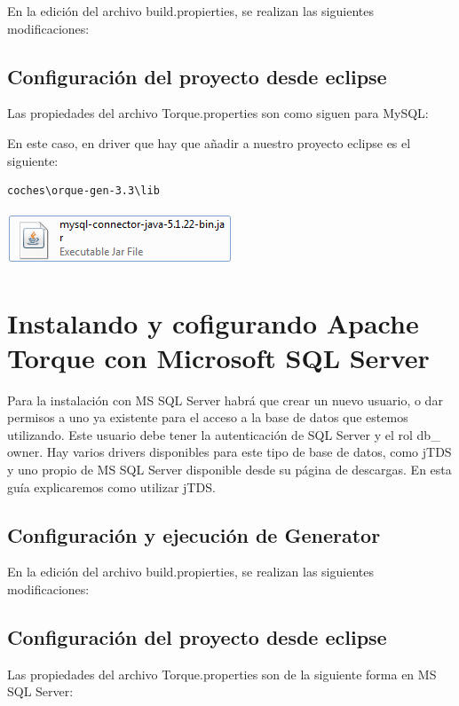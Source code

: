 \documentclass[12pt, oneside]{article}
\begin{document}
En la edición del archivo build.propierties, se realizan las siguientes modificaciones:


\subsection{Configuración del proyecto desde eclipse}
Las propiedades del archivo Torque.properties son como siguen para MySQL:



En este caso, en driver que hay que añadir a nuestro proyecto eclipse es el siguiente:
\begin{lstlisting}
coches\orque-gen-3.3\lib
\end{lstlisting}

\begin{center}
	\includegraphics{img/mysql-file.png}
\end{center}

\section{Instalando y cofigurando Apache Torque con Microsoft SQL Server}
Para la instalación con MS SQL Server habrá que crear un nuevo usuario, o dar permisos a uno ya existente para el acceso a la base de datos que estemos utilizando. Este usuario debe tener la autenticación de SQL Server y el rol db\_ owner. Hay varios drivers disponibles para este tipo de base de datos, como jTDS y uno propio de MS SQL Server disponible desde su página de descargas. En esta guía explicaremos como utilizar jTDS.

\subsection{Configuración y ejecución de Generator}
En la edición del archivo build.propierties, se realizan las siguientes modificaciones:



\subsection{Configuración del proyecto desde eclipse}
Las propiedades del archivo Torque.properties son de la siguiente forma en MS SQL Server:
\end{document}

